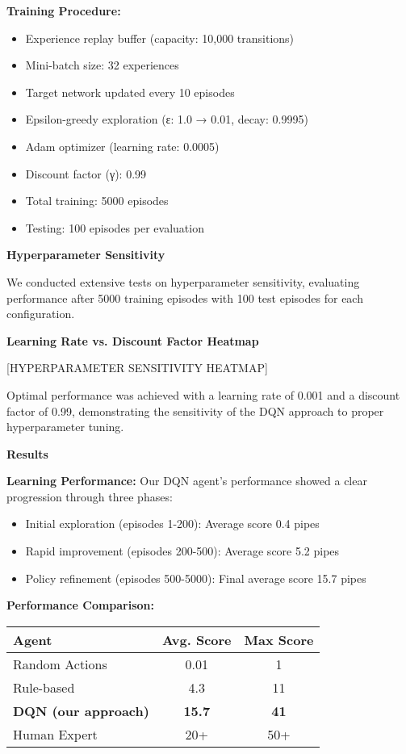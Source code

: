 \documentclass[a1paper,portrait]{article}
\newcommand{\postersection}[1]{
  \vspace{0.5cm}
  \noindent\textcolor{headerblue}{\Large\textbf{#1}}
  \vspace{0.3cm}
}
\begin{document}
\begin{multicols}{3}
\textbf{Training Procedure:}
\begin{itemize}
    \item Experience replay buffer (capacity: 10,000 transitions)
    \item Mini-batch size: 32 experiences
    \item Target network updated every 10 episodes
    \item Epsilon-greedy exploration (ε: 1.0 → 0.01, decay: 0.9995)
    \item Adam optimizer (learning rate: 0.0005)
    \item Discount factor (γ): 0.99
    \item Total training: 5000 episodes
    \item Testing: 100 episodes per evaluation
\end{itemize}

\postersection{Hyperparameter Sensitivity}
We conducted extensive tests on hyperparameter sensitivity, evaluating performance after 5000 training episodes with 100 test episodes for each configuration.

\begin{center}
\textbf{Learning Rate vs. Discount Factor Heatmap}
\vspace{0.5cm}

[HYPERPARAMETER SENSITIVITY HEATMAP]
\end{center}

Optimal performance was achieved with a learning rate of 0.001 and a discount factor of 0.99, demonstrating the sensitivity of the DQN approach to proper hyperparameter tuning.

\postersection{Results}
\textbf{Learning Performance:}
Our DQN agent's performance showed a clear progression through three phases:
\begin{itemize}
    \item Initial exploration (episodes 1-200): Average score 0.4 pipes
    \item Rapid improvement (episodes 200-500): Average score 5.2 pipes
    \item Policy refinement (episodes 500-5000): Final average score 15.7 pipes
\end{itemize}

\textbf{Performance Comparison:}
\begin{center}
\begin{tabular}{lcc}
\toprule
\textbf{Agent} & \textbf{Avg. Score} & \textbf{Max Score} \\
\midrule
Random Actions & 0.01 & 1 \\
Rule-based & 4.3 & 11 \\
\textbf{DQN (our approach)} & \textbf{15.7} & \textbf{41} \\
Human Expert & 20+ & 50+ \\
\bottomrule
\end{tabular}
\end{center}


\end{multicols}
\end{document}
